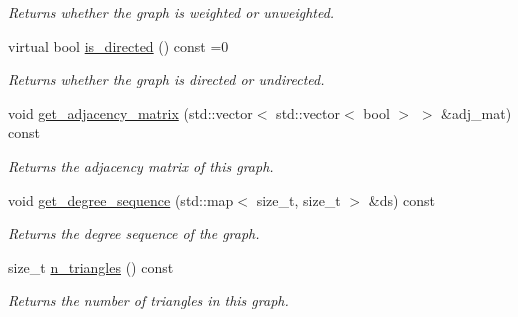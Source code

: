 \begin{DoxyCompactItemize}
\begin{DoxyCompactList}\small\item\em Returns whether the graph is weighted or unweighted. \end{DoxyCompactList}\item 
virtual bool \hyperlink{classlgraph_1_1xxgraph_a0a606d77cbbb2efa7056b82c3b8c395c}{is\+\_\+directed} () const =0
\begin{DoxyCompactList}\small\item\em Returns whether the graph is directed or undirected. \end{DoxyCompactList}\item 
\mbox{\label{classlgraph_1_1xxgraph_a8108bac3649acfae39a45e6de2b339b6}} 
void \hyperlink{classlgraph_1_1xxgraph_a8108bac3649acfae39a45e6de2b339b6}{get\+\_\+adjacency\+\_\+matrix} (std\+::vector$<$ std\+::vector$<$ bool $>$ $>$ \&adj\+\_\+mat) const
\begin{DoxyCompactList}\small\item\em Returns the adjacency matrix of this graph. \end{DoxyCompactList}\item 
void \hyperlink{classlgraph_1_1xxgraph_a5b21b51f5f9c55c05c0e8e5bc836bf87}{get\+\_\+degree\+\_\+sequence} (std\+::map$<$ size\+\_\+t, size\+\_\+t $>$ \&ds) const
\begin{DoxyCompactList}\small\item\em Returns the degree sequence of the graph. \end{DoxyCompactList}\item 
size\+\_\+t \hyperlink{classlgraph_1_1xxgraph_a90a9b60caf18179576af61dc962b95e3}{n\+\_\+triangles} () const
\begin{DoxyCompactList}\small\item\em Returns the number of triangles in this graph. \end{DoxyCompactList}\end{DoxyCompactItemize}
